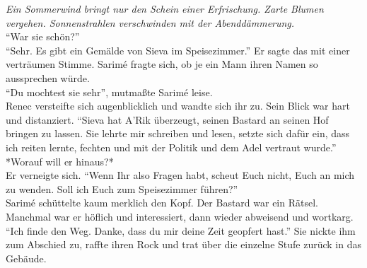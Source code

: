 \textit{Ein Sommerwind bringt nur den Schein einer Erfrischung. Zarte Blumen vergehen. 
Sonnenstrahlen verschwinden mit der Abenddämmerung.}\\
``War sie schön?''\\
``Sehr. Es gibt ein Gemälde von Sieva im Speisezimmer.'' Er sagte das mit einer verträumen Stimme. 
Sarimé fragte sich, ob je ein Mann ihren Namen so aussprechen würde. \\
``Du mochtest sie sehr'', mutmaßte Sarimé leise.\\
Renec versteifte sich augenblicklich und wandte sich ihr zu. Sein Blick war hart und distanziert. 
``Sieva hat A'Rik überzeugt, seinen Bastard an seinen Hof bringen zu lassen. Sie lehrte mir 
schreiben und lesen, setzte sich dafür ein, dass ich reiten lernte, fechten und mit der Politik und 
dem Adel vertraut wurde.''\\
*Worauf will er hinaus?*\\
Er verneigte sich. ``Wenn Ihr also Fragen habt, scheut Euch nicht, Euch an mich zu wenden. Soll ich 
Euch zum Speisezimmer führen?''\\
Sarimé schüttelte kaum merklich den Kopf. Der Bastard war ein Rätsel. Manchmal war er höflich und 
interessiert, dann wieder abweisend und wortkarg. ``Ich finde den Weg. Danke, dass du mir deine 
Zeit geopfert hast.'' Sie nickte ihm zum Abschied zu, raffte ihren Rock und trat über die einzelne 
Stufe zurück in das Gebäude.\\

